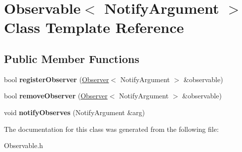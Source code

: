 \hypertarget{classObservable}{\section{Observable$<$ Notify\-Argument $>$ Class Template Reference}
\label{classObservable}
}
\subsection*{Public Member Functions}
\begin{DoxyCompactItemize}
\item 
\hypertarget{classObservable_a67b3bb2b5fbf3d29e1366f8e04115b6f}{bool {\bfseries register\-Observer} (\hyperlink{classObserver}{Observer}$<$ Notify\-Argument $>$ \&observable)}\label{classObservable_a67b3bb2b5fbf3d29e1366f8e04115b6f}

\item 
\hypertarget{classObservable_a93fca2f7da9fe212f8e27d299f3feddf}{bool {\bfseries remove\-Observer} (\hyperlink{classObserver}{Observer}$<$ Notify\-Argument $>$ \&observable)}\label{classObservable_a93fca2f7da9fe212f8e27d299f3feddf}

\item 
\hypertarget{classObservable_a48deae3a33d042b8eb2e3a0265b25e64}{void {\bfseries notify\-Observes} (Notify\-Argument \&arg)}\label{classObservable_a48deae3a33d042b8eb2e3a0265b25e64}

\end{DoxyCompactItemize}


The documentation for this class was generated from the following file\-:\begin{DoxyCompactItemize}
\item 
Observable.\-h\end{DoxyCompactItemize}

